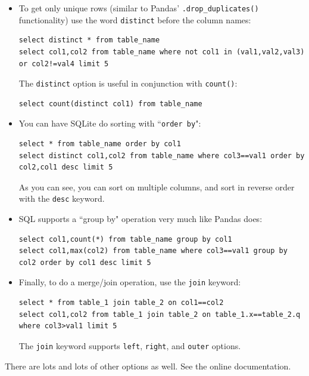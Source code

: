 \documentclass[12pt]{article}
\begin{document}
\begin{itemize}
\item To get only unique rows (similar to Pandas' \texttt{.drop\_duplicates()}
functionality) use the word \texttt{distinct} before the column names:

\scriptsize
\begin{Verbatim}[fontsize=small,samepage=true,frame=none]
select distinct * from table_name
select col1,col2 from table_name where not col1 in (val1,val2,val3) or col2!=val4 limit 5
\end{Verbatim}
\normalsize

The \texttt{distinct} option is useful in conjunction with \texttt{count()}:
\scriptsize
\begin{Verbatim}[fontsize=small,samepage=true,frame=none]
select count(distinct col1) from table_name
\end{Verbatim}
\normalsize

\item You can have SQLite do sorting with ``\texttt{order by}":
\scriptsize
\begin{Verbatim}[fontsize=small,samepage=true,frame=none]
select * from table_name order by col1
select distinct col1,col2 from table_name where col3==val1 order by col2,col1 desc limit 5
\end{Verbatim}
\normalsize

As you can see, you can sort on multiple columns, and sort in reverse order
with the \texttt{desc} keyword.

\item SQL supports a ``group by" operation very much like Pandas does:

\scriptsize
\begin{Verbatim}[fontsize=small,samepage=true,frame=none]
select col1,count(*) from table_name group by col1
select col1,max(col2) from table_name where col3==val1 group by col2 order by col1 desc limit 5
\end{Verbatim}
\normalsize

\item Finally, to do a merge/join operation, use the \texttt{join} keyword:

\scriptsize
\begin{Verbatim}[fontsize=small,samepage=true,frame=none]
select * from table_1 join table_2 on col1==col2
select col1,col2 from table_1 join table_2 on table_1.x==table_2.q where col3>val1 limit 5
\end{Verbatim}
\normalsize

The \texttt{join} keyword supports \texttt{left}, \texttt{right}, and
\texttt{outer} options.

\end{itemize}

There are lots and lots of other options as well. See the online
documentation.
\end{document}
